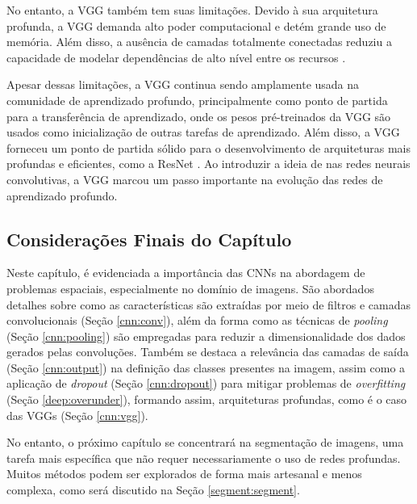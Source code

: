 No entanto, a VGG também tem suas limitações. Devido à sua arquitetura profunda, a VGG demanda alto poder computacional e detém grande uso de memória. Além disso, a ausência de camadas totalmente conectadas reduziu a capacidade de modelar dependências de alto nível entre os recursos \citep{Simonyan2015}.

Apesar dessas limitações, a VGG continua sendo amplamente usada na comunidade de aprendizado profundo, principalmente como ponto de partida para a transferência de aprendizado, onde os pesos pré-treinados da VGG são usados como inicialização de outras tarefas de aprendizado. Além disso, a VGG forneceu um ponto de partida sólido para o desenvolvimento de arquiteturas mais profundas e eficientes, como a ResNet \citep{He2016}. Ao introduzir a ideia de  nas redes neurais convolutivas, a VGG marcou um passo importante na evolução das redes de aprendizado profundo.

\subsection{Considerações Finais do Capítulo}
\label{cnn:conclusion}
Neste capítulo, é evidenciada a importância das CNNs na abordagem de problemas espaciais, especialmente no domínio de imagens. São abordados detalhes sobre como as características são extraídas por meio de filtros e camadas convolucionais (Seção \ref{cnn:conv}), além da forma como as técnicas de \textit{pooling} (Seção \ref{cnn:pooling}) são empregadas para reduzir a dimensionalidade dos dados gerados pelas convoluções. Também se destaca a relevância das camadas de saída (Seção \ref{cnn:output}) na definição das classes presentes na imagem, assim como a aplicação de \textit{dropout} (Seção \ref{cnn:dropout}) para mitigar problemas de \textit{overfitting} (Seção \ref{deep:overunder}), formando assim, arquiteturas profundas, como é o caso das VGGs (Seção \ref{cnn:vgg}).

No entanto, o próximo capítulo se concentrará na segmentação de imagens, uma tarefa mais específica que não requer necessariamente o uso de redes profundas. Muitos métodos podem ser explorados de forma mais artesanal e menos complexa, como será discutido na Seção \ref{segment:segment}.
